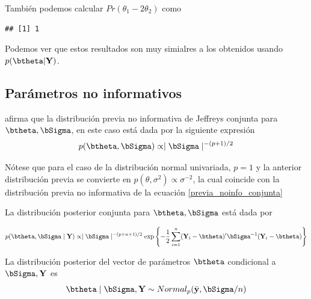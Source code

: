 \begin{Eje}
\begin{knitrout}
\begin{kframe}
\end{kframe}
\end{knitrout}
También podemos calcular $Pr(\theta_1-2\theta_2)$ como 
\begin{knitrout}
\color{fgcolor}\begin{kframe}
\begin{alltt}
\hlstd{(theta.pos[,}\hlstd{]} \hlopt{>} \hlopt{*}\hlstd{theta.pos[,}\hlstd{])}\hlopt{/}
\end{alltt}
\begin{verbatim}
## [1] 1
\end{verbatim}
\end{kframe}
\end{knitrout}
Podemos ver que estos resultados son muy simialres a los obtenidos usando $p(\btheta|\mathbf{Y})$.
\end{Eje}
                              
\subsection{Parámetros no informativos}

 afirma que la distribución previa no informativa de Jeffreys conjunta para $\btheta,\bSigma$, en este caso está dada por la siguiente expresión
\begin{equation*}
p(\btheta,\bSigma)\propto \mid \bSigma \mid ^{-(p+1)/2}
\end{equation*}

Nótese que para el caso de la distribución normal univariada, $p=1$ y la anterior distribución previa se convierte en $p(\theta,\sigma^2)\propto \sigma^{-2}$, la cual coincide con la distribución previa no informativa de la ecuación \ref{previa_noinfo_conjunta} 

La distribución posterior conjunta para $\btheta,\bSigma$ está dada por

\begin{equation*}
p(\btheta,\bSigma \mid \mathbf{Y})\propto
\mid \bSigma \mid ^{-(p+n+1)/2}
\exp\left\{ -\frac{1}{2}\sum_{i=1}^n
  (\mathbf{Y}_i-\btheta)'\bSigma^{-1}(\mathbf{Y}_i-\btheta)\right\}
  \end{equation*}
  
\begin{Res}
La distribución posterior del vector de parámetros $\btheta$ condicional a $\bSigma,\mathbf{Y}$ es
\begin{equation*}
\btheta \mid \bSigma,\mathbf{Y}\sim Normal_p(\bar{\mathbf{y}},\bSigma/n)
\end{equation*}
\end{Res}
  
